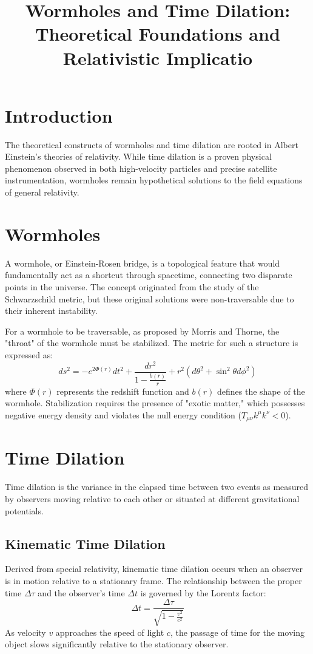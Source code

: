 \documentclass[12pt, a4paper]{article}
\title{Wormholes and Time Dilation: Theoretical Foundations and Relativistic Implicatio}
\author{}
\date{}
\begin{document}
\maketitle

\section{Introduction}
The theoretical constructs of wormholes and time dilation are rooted in Albert Einstein's theories of relativity. While time dilation is a proven physical phenomenon observed in both high-velocity particles and precise satellite instrumentation, wormholes remain hypothetical solutions to the field equations of general relativity.

\section{Wormholes}
A wormhole, or Einstein-Rosen bridge, is a topological feature that would fundamentally act as a shortcut through spacetime, connecting two disparate points in the universe. The concept originated from the study of the Schwarzschild metric, but these original solutions were non-traversable due to their inherent instability.

For a wormhole to be traversable, as proposed by Morris and Thorne, the "throat" of the wormhole must be stabilized. The metric for such a structure is expressed as:
\[ ds^2 = -e^{2\Phi(r)} dt^2 + \frac{dr^2}{1 - \frac{b(r)}{r}} + r^2(d\theta^2 + \sin^2\theta d\phi^2) \]
where $\Phi(r)$ represents the redshift function and $b(r)$ defines the shape of the wormhole. Stabilization requires the presence of "exotic matter," which possesses negative energy density and violates the null energy condition ($T_{\mu\nu}k^\mu k^\nu < 0$).

\section{Time Dilation}
Time dilation is the variance in the elapsed time between two events as measured by observers moving relative to each other or situated at different gravitational potentials.

\subsection{Kinematic Time Dilation}
Derived from special relativity, kinematic time dilation occurs when an observer is in motion relative to a stationary frame. The relationship between the proper time $\Delta \tau$ and the observer's time $\Delta t$ is governed by the Lorentz factor:
\[ \Delta t = \frac{\Delta \tau}{\sqrt{1 - \frac{v^2}{c^2}}} \]
As velocity $v$ approaches the speed of light $c$, the passage of time for the moving object slows significantly relative to the stationary observer.
\end{document}
